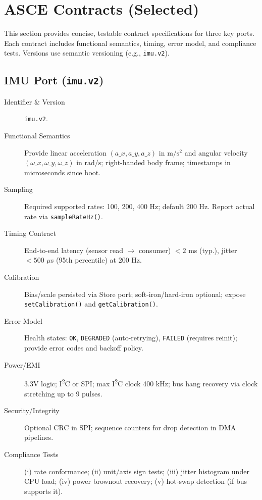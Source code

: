 \section{ASCE Contracts (Selected)}\label{sec:contracts}
This section provides concise, testable contract specifications for three key ports. Each contract includes functional semantics, timing, error model, and compliance tests. Versions use semantic versioning (e.g., \texttt{imu.v2}).

\subsection{IMU Port (\texttt{imu.v2})}\label{subsec:imu-contract}
\begin{description}
\item[Identifier \& Version] \texttt{imu.v2}.
\item[Functional Semantics] Provide linear acceleration $(a\_x,a\_y,a\_z)$ in $\mathrm{m/s^2}$ and angular velocity $(\omega\_x,\omega\_y,\omega\_z)$ in $\mathrm{rad/s}$; right-handed body frame; timestamps in microseconds since boot.
\item[Sampling] Required supported rates: {100, 200, 400} Hz; default 200 Hz. Report actual rate via \texttt{sampleRateHz()}.
\item[Timing Contract] End-to-end latency (sensor read $\rightarrow$ consumer) $< 2$ ms (typ.), jitter $< 500$ $\mu$s (95th percentile) at 200 Hz.
\item[Calibration] Bias/scale persisted via Store port; soft-iron/hard-iron optional; expose \texttt{setCalibration()} and \texttt{getCalibration()}.
\item[Error Model] Health states: \texttt{OK}, \texttt{DEGRADED} (auto-retrying), \texttt{FAILED} (requires reinit); provide error codes and backoff policy.
\item[Power/EMI] 3.3V logic; I\textsuperscript{2}C or SPI; max I\textsuperscript{2}C clock 400 kHz; bus hang recovery via clock stretching up to 9 pulses.
\item[Security/Integrity] Optional CRC in SPI; sequence counters for drop detection in DMA pipelines.
\item[Compliance Tests] (i) rate conformance; (ii) unit/axis sign tests; (iii) jitter histogram under CPU load; (iv) power brownout recovery; (v) hot-swap detection (if bus supports it).
\end{description}

